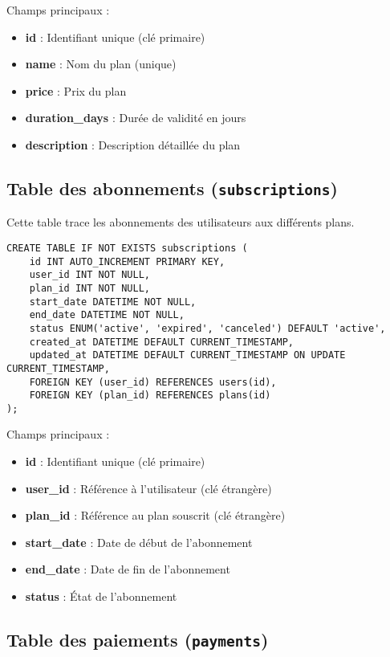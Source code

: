 \documentclass[12pt,a4paper]{report}
\begin{document}
Champs principaux :
\begin{itemize}
    \item \textbf{id} : Identifiant unique (clé primaire)
    \item \textbf{name} : Nom du plan (unique)
    \item \textbf{price} : Prix du plan
    \item \textbf{duration\_days} : Durée de validité en jours
    \item \textbf{description} : Description détaillée du plan
\end{itemize}

\subsection{Table des abonnements (\texttt{subscriptions})}

Cette table trace les abonnements des utilisateurs aux différents plans.

\begin{lstlisting}[style=sqlStyle, caption=Structure de la table subscriptions]
CREATE TABLE IF NOT EXISTS subscriptions (
    id INT AUTO_INCREMENT PRIMARY KEY,
    user_id INT NOT NULL,
    plan_id INT NOT NULL,
    start_date DATETIME NOT NULL,
    end_date DATETIME NOT NULL,
    status ENUM('active', 'expired', 'canceled') DEFAULT 'active',
    created_at DATETIME DEFAULT CURRENT_TIMESTAMP,
    updated_at DATETIME DEFAULT CURRENT_TIMESTAMP ON UPDATE CURRENT_TIMESTAMP,
    FOREIGN KEY (user_id) REFERENCES users(id),
    FOREIGN KEY (plan_id) REFERENCES plans(id)
);
\end{lstlisting}

Champs principaux :
\begin{itemize}
    \item \textbf{id} : Identifiant unique (clé primaire)
    \item \textbf{user\_id} : Référence à l'utilisateur (clé étrangère)
    \item \textbf{plan\_id} : Référence au plan souscrit (clé étrangère)
    \item \textbf{start\_date} : Date de début de l'abonnement
    \item \textbf{end\_date} : Date de fin de l'abonnement
    \item \textbf{status} : État de l'abonnement
\end{itemize}

\subsection{Table des paiements (\texttt{payments})}
\end{document}
